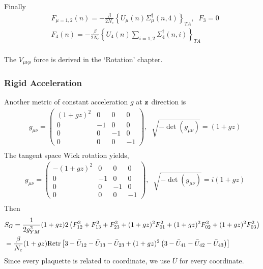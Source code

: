 Finally
\begin{equation}
\begin{split}
&F_{\mu=1,2}(n)=-\frac{\beta}{2N_c}\left\{U_{\mu}(n)\Sigma _{\mu}^{\dagger}(n,4)\right\}_{TA},\;\;F_3=0\\
&F_{4}(n)=-\frac{\beta}{2N_c}\left\{U_{4}(n)\sum _{i=1,2}\Sigma _{4}^{\dagger}(n,i)\right\}_{TA}\\
\end{split}
\end{equation}

The $V_{\mu\nu\rho}$ force is derived in the `Rotation' chapter.

\subsubsection{\label{sec:AnotherAcceleration}Rigid Acceleration}

Another metric of constant acceleration $g$ at ${\bf z}$ direction is
\begin{equation}
\begin{split}
&g_{\mu\nu}=\left(\begin{array}{cccc} \left(1 + gz\right)^2 & 0 & 0 & 0 \\ 0 & -1 & 0 & 0 \\ 0 & 0 & -1 & 0 \\ 0 & 0 & 0 & -1 \end{array}\right),\;\;\sqrt{-\det (g_{\mu\nu})}=(1+gz)\\
\end{split}
\end{equation}
The tangent space Wick rotation yields, 
\begin{equation}
\begin{split}
&g_{\mu\nu}=\left(\begin{array}{cccc} -\left(1 + gz\right)^2 & 0 & 0 & 0 \\ 0 & -1 & 0 & 0 \\ 0 & 0 & -1 & 0 \\ 0 & 0 & 0 & -1 \end{array}\right),\;\;\sqrt{-\det (g_{\mu\nu})}=i(1+gz)\\
\end{split}
\end{equation}
Then
\begin{equation}
\begin{split}
&S_G=\frac{1}{2g_{YM}^2}(1+g z)2\left(F_{12}^2+F_{13}^2+F_{23}^2+(1+g z)^2F_{01}^2+(1+g z)^2F_{02}^2+(1+g z)^2F_{03}^2\right)\\
&=\frac{\beta}{N_c}(1+g z){\rm Retr}\left[3-\bar{U}_{12}-\bar{U}_{13}-\bar{U}_{23}+(1+g z)^2\left(3-\bar{U}_{41}-\bar{U}_{42}-\bar{U}_{43}\right)\right]\\
\end{split}
\end{equation}
Since every plaquette is related to coordinate, we use $\bar{U}$ for every coordinate.


